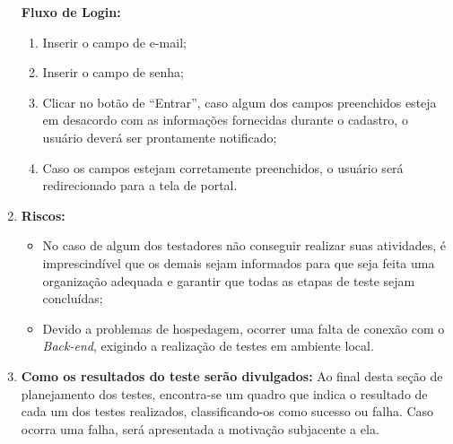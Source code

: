 \begin{enumerate}
\textbf{Fluxo de Login:}
\begin{enumerate}
\item Inserir o campo de e-mail;
\item Inserir o campo de senha;
\item Clicar no botão de ``Entrar'', caso algum dos campos preenchidos esteja em desacordo com as informações fornecidas durante o cadastro, o usuário deverá ser prontamente notificado;
\item Caso os campos estejam corretamente preenchidos, o usuário será redirecionado para a tela de portal.
\end{enumerate}

\item{\textbf{Riscos:}}
\begin{itemize}
\item No caso de algum dos testadores não conseguir realizar suas atividades, é imprescindível que os demais sejam informados para que seja feita uma organização adequada e garantir que todas as etapas de teste sejam concluídas;
\item Devido a problemas de hospedagem, ocorrer uma falta de conexão com o \textit{\gls{Back-end}}, exigindo a realização de testes em ambiente local.
\end{itemize}

\item{\textbf{Como os resultados do teste serão divulgados:}}
Ao final desta seção de planejamento dos testes, encontra-se um quadro que indica o resultado de cada um dos testes realizados, classificando-os como sucesso ou falha. Caso ocorra uma falha, será apresentada a motivação subjacente a ela.
\end{enumerate}

